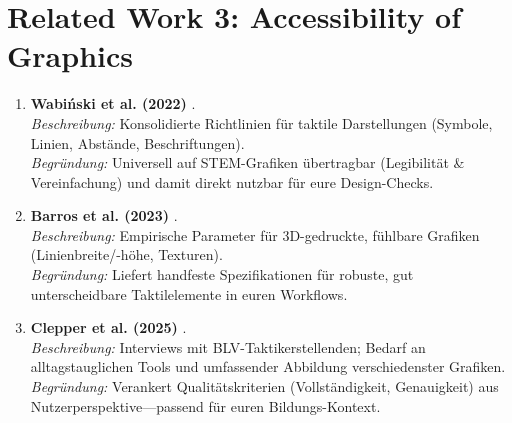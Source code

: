 \section{Related Work 3: Accessibility of Graphics}
\begin{enumerate}
  \item \textbf{Wabi{\'n}ski et al. (2022)} \cite{Wabinski2022TactileMaps}.\\
  \emph{Beschreibung:} Konsolidierte Richtlinien für taktile Darstellungen (Symbole, Linien, Abstände, Beschriftungen).\\
  \emph{Begründung:} Universell auf STEM-Grafiken übertragbar (Legibilität \& Vereinfachung) und damit direkt nutzbar für eure Design-Checks.
  
  \item \textbf{Barros et al. (2023)} \cite{Barros2023Tactile3D}.\\
  \emph{Beschreibung:} Empirische Parameter für 3D-gedruckte, fühlbare Grafiken (Linienbreite/-höhe, Texturen).\\
  \emph{Begründung:} Liefert handfeste Spezifikationen für robuste, gut unterscheidbare Taktilelemente in euren Workflows.
  
  \item \textbf{Clepper et al. (2025)} \cite{Clepper2025Tactile}.\\
  \emph{Beschreibung:} Interviews mit BLV-Taktikerstellenden; Bedarf an alltagstauglichen Tools und umfassender Abbildung verschiedenster Grafiken.\\
  \emph{Begründung:} Verankert Qualitätskriterien (Vollständigkeit, Genauigkeit) aus Nutzerperspektive—passend für euren Bildungs-Kontext.
\end{enumerate}

